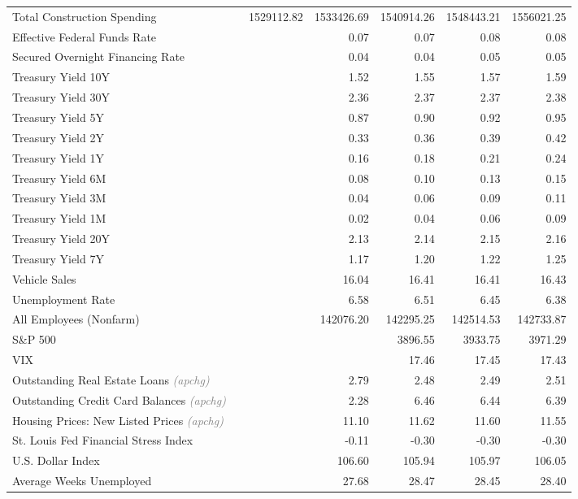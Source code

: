 \documentclass[11pt, letterpaper]{article}\usepackage[]{graphicx}\usepackage[]{color}
\begin{document}
\begin{table}[H]
\begin{tabular}{lrrrrrr}
  Total Construction Spending &  & 1529112.82 & 1533426.69 & 1540914.26 & 1548443.21 & 1556021.25 \\ 
  Effective Federal Funds Rate &  &  & 0.07 & 0.07 & 0.08 & 0.08 \\ 
  Secured Overnight Financing Rate &  &  & 0.04 & 0.04 & 0.05 & 0.05 \\ 
  Treasury Yield 10Y &  &  & 1.52 & 1.55 & 1.57 & 1.59 \\ 
  Treasury Yield 30Y &  &  & 2.36 & 2.37 & 2.37 & 2.38 \\ 
  Treasury Yield 5Y &  &  & 0.87 & 0.90 & 0.92 & 0.95 \\ 
  Treasury Yield 2Y &  &  & 0.33 & 0.36 & 0.39 & 0.42 \\ 
  Treasury Yield 1Y &  &  & 0.16 & 0.18 & 0.21 & 0.24 \\ 
  Treasury Yield 6M &  &  & 0.08 & 0.10 & 0.13 & 0.15 \\ 
  Treasury Yield 3M &  &  & 0.04 & 0.06 & 0.09 & 0.11 \\ 
  Treasury Yield 1M &  &  & 0.02 & 0.04 & 0.06 & 0.09 \\ 
  Treasury Yield 20Y &  &  & 2.13 & 2.14 & 2.15 & 2.16 \\ 
  Treasury Yield 7Y &  &  & 1.17 & 1.20 & 1.22 & 1.25 \\ 
  Vehicle Sales &  &  & 16.04 & 16.41 & 16.41 & 16.43 \\ 
  Unemployment Rate &  &  & 6.58 & 6.51 & 6.45 & 6.38 \\ 
  All Employees (Nonfarm) &  &  & 142076.20 & 142295.25 & 142514.53 & 142733.87 \\ 
  S\&P 500 &  &  &  & 3896.55 & 3933.75 & 3971.29 \\ 
  VIX &  &  &  & 17.46 & 17.45 & 17.43 \\ 
  Outstanding Real Estate Loans \textit{\footnotesize\textcolor{gray}{(apchg)}} &  &  & 2.79 & 2.48 & 2.49 & 2.51 \\ 
  Outstanding Credit Card Balances \textit{\footnotesize\textcolor{gray}{(apchg)}} &  &  & 2.28 & 6.46 & 6.44 & 6.39 \\ 
  Housing Prices: New Listed Prices \textit{\footnotesize\textcolor{gray}{(apchg)}} &  &  & 11.10 & 11.62 & 11.60 & 11.55 \\ 
  St. Louis Fed Financial Stress Index &  &  & -0.11 & -0.30 & -0.30 & -0.30 \\ 
  U.S. Dollar Index &  &  & 106.60 & 105.94 & 105.97 & 106.05 \\ 
  Average Weeks Unemployed &  &  & 27.68 & 28.47 & 28.45 & 28.40 \\ 

\end{tabular}
\end{table}
\end{document}
